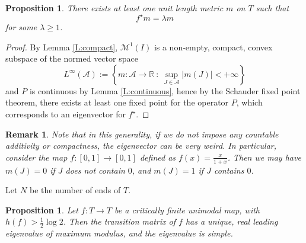 \documentclass[11pt]{amsart}
\newtheorem{proposition}[theorem]{Proposition}
\newtheorem{remark}[theorem]{Remark}
\begin{document}
\begin{proposition}
There exists at least one unit length metric $m$ on $T$ such that 
$$f^\star m  = \lambda m$$
for some $\lambda \geq 1$.
\end{proposition}

\begin{proof}
By Lemma \ref{L:compact}, 
$\mathcal{M}^1(I)$ is a non-empty, compact, convex subspace of the normed vector space 
$$L^\infty(\mathcal{A}) := \left\{  m : \mathcal{A} \to \mathbb{R} \ : \ \sup_{J \in \mathcal{A}} |m(J)| < + \infty \right\}$$
and $P$ is continuous by Lemma \ref{L:continuous}, hence by the Schauder fixed point theorem, there exists at least one fixed point for the operator $P$, which corresponds to an eigenvector for $f^\star$. 
\end{proof}

\begin{remark}
Note that in this generality, if we do not impose any countable additivity or compactness, 
the eigenvector can be very weird. In particular, consider the map 
$f : [0, 1] \to [0,1]$ defined as 
$f(x) = \frac{x}{1+x}$. 
Then we may have 
$m(J) = 0$ if $J$ does not contain $0$, and 
$m(J) = 1$ if $J$ contains $0$. 
\end{remark}

Let $N$ be the number of ends of $T$.

\begin{proposition}
Let $f : T \to T$ be a critically finite unimodal map, with $h(f) > \frac{1}{2} \log 2$.
Then the transition matrix of $f$ has a unique, real leading eigenvalue of maximum modulus, 
and the eigenvalue is simple. 
\end{proposition}
\end{document}
